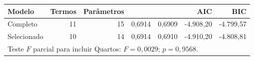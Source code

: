 \begin{tabular}{lrrrrrr}
\toprule
Modelo & Termos & Parâmetros & \Rtwo{} & \Rtwoadj{} & AIC & BIC \\
\midrule
Completo & 11 & 15 & 0,6914 & 0,6909 & -4.908,20 & -4.799,57 \\
Selecionado & 10 & 14 & 0,6914 & 0,6910 & -4.910,20 & -4.808,81 \\
\midrule
\multicolumn{7}{l}{\footnotesize Teste $F$ parcial para incluir Quartos: $F=0,0029$; $p=0,9568$.}\\
\bottomrule
\end{tabular}

